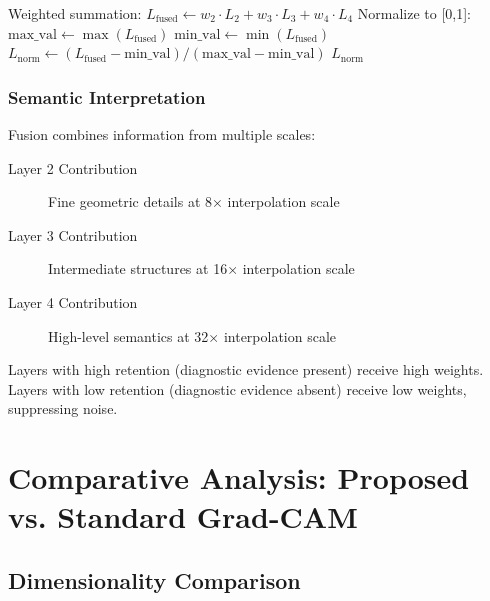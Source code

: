 \documentclass[12pt,a4paper,oneside]{book}
\begin{document}
\begin{algorithm}[H]
\caption{Multi-Layer Heatmap Fusion}
\begin{algorithmic}[1]
  \State Weighted summation:
  \State \quad $L_{\text{fused}} \gets w_2 \cdot L_2 + w_3 \cdot L_3 + w_4 \cdot L_4$
  \State
  \State Normalize to [0,1]:
  \State \quad $\text{max\_val} \gets \max(L_{\text{fused}})$
  \State \quad $\text{min\_val} \gets \min(L_{\text{fused}})$
  \State \quad $L_{\text{norm}} \gets (L_{\text{fused}} - \text{min\_val}) / (\text{max\_val} - \text{min\_val})$
  \State
  \Return $L_{\text{norm}}$
\EndProcedure
\end{algorithmic}
\end{algorithm}

\subsection{Semantic Interpretation}

Fusion combines information from multiple scales:

\begin{description}
  \item[Layer 2 Contribution] Fine geometric details at 8× interpolation scale
  \item[Layer 3 Contribution] Intermediate structures at 16× interpolation scale
  \item[Layer 4 Contribution] High-level semantics at 32× interpolation scale
\end{description}

Layers with high retention (diagnostic evidence present) receive high weights. Layers with low retention (diagnostic evidence absent) receive low weights, suppressing noise.

\chapter{Comparative Analysis: Proposed vs. Standard Grad-CAM}
\label{ch:comparison}

\section{Dimensionality Comparison}
\end{document}

